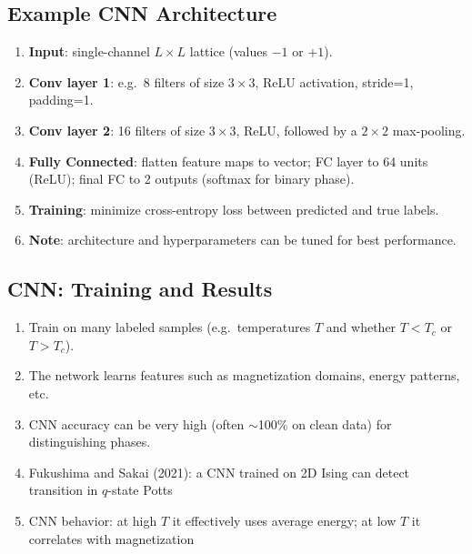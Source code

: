 \documentclass[%
oneside,                 %
final,                   %
10pt]{article}
\begin{document}
\noindent
\subsection{Example CNN Architecture}
\begin{enumerate}
\item \textbf{Input}: single-channel $L\times L$ lattice (values $-1$ or $+1$).

\item \textbf{Conv layer 1}: e.g.\ 8 filters of size $3\times3$, ReLU activation, stride=1, padding=1.

\item \textbf{Conv layer 2}: 16 filters of size $3\times3$, ReLU, followed by a $2\times2$ max-pooling.

\item \textbf{Fully Connected}: flatten feature maps to vector; FC layer to 64 units (ReLU); final FC to 2 outputs (softmax for binary phase).

\item \textbf{Training}: minimize cross-entropy loss between predicted and true labels.

\item \textbf{Note}: architecture and hyperparameters can be tuned for best performance.
\end{enumerate}

\noindent
\subsection{CNN: Training and Results}
\begin{enumerate}
\item Train on many labeled samples (e.g.\ temperatures $T$ and whether $T<T_c$ or $T>T_c$).

\item The network learns features such as magnetization domains, energy patterns, etc.

\item CNN accuracy can be very high (often $\sim$100\% on clean data) for distinguishing phases.

\item Fukushima and Sakai (2021): a CNN trained on 2D Ising can detect transition in $q$-state Potts 

\item CNN behavior: at high $T$ it effectively uses average energy; at low $T$ it correlates with magnetization 
\end{enumerate}
\end{document}
